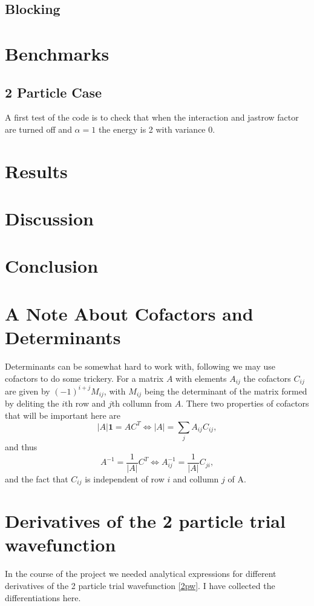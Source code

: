 \documentclass[a4paper,English,10pt]{article}
\newcommand{\bb}[1]{\boldsymbol{#1}}
\newcommand{\id}{\bb{1}}
\newcommand{\be}{\begin{equation}}
\newcommand{\ee}{\end{equation}}
\newcommand{\f}{\frac}
\begin{document}
\subsection{Blocking}

\section{Benchmarks}

\subsection{2 Particle Case}
A first test of the code is to check that when the interaction and jastrow factor are turned off and $\alpha = 1$ the energy is 2 with variance 0.

\section{Results}

\section{Discussion}

\section{Conclusion}



\appendix
\section{A Note About Cofactors and Determinants}\label{cofac}
Determinants can be somewhat hard to work with, following \cite{mortenbok} we may use cofactors to do some trickery.
For a matrix $A$ with elements $A_{ij}$ the cofactors $C_{ij}$ are given by $(-1)^{i+j} M_{ij}$, with $M_{ij}$ being the determinant of the matrix formed by deliting the $i$th
row and $j$th collumn from $A$. There two properties of cofactors that will be important here are
\be
|A|\id = A C^T \Leftrightarrow |A| = \sum_jA_{ij}C_{ij},
\ee
and thus
\be
A^{-1} = \f{1}{|A|}C^T \Leftrightarrow A^{-1}_{ij} = \f{1}{|A|}C_{ji},
\ee
and the fact that $C_{ij}$ is independent of row $i$ and collumn $j$ of A.





\section{Derivatives of the 2 particle trial wavefunction}
In the course of the project we needed analytical expressions for different derivatives of the 2 particle trial wavefunction \ref{2pw}. I have collected
the differentiations here.
\end{document}
